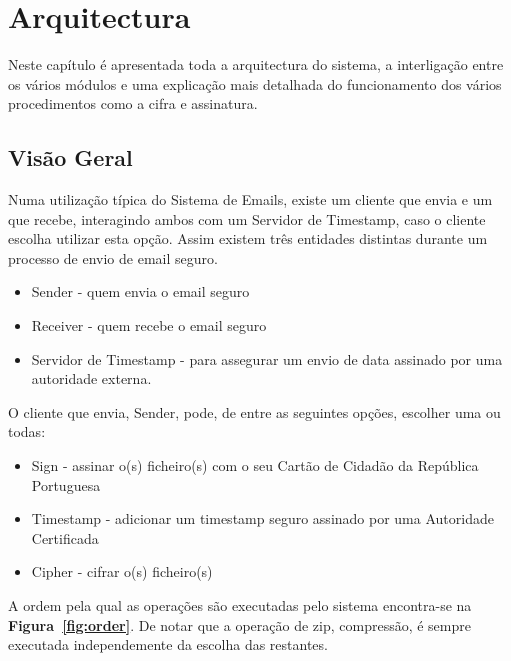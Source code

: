 \chapter{Arquitectura}
\label{chapter:architecture}
Neste capítulo é apresentada toda a arquitectura do sistema, a interligação entre os vários módulos e uma explicação mais detalhada do funcionamento dos vários procedimentos como a cifra e assinatura.
\section{Visão Geral}
\label{section:estrutura}

Numa utilização típica do Sistema de Emails, existe um cliente que envia e um que recebe, interagindo ambos com um Servidor de Timestamp, caso o cliente escolha utilizar esta opção.
Assim existem três entidades distintas durante um processo de envio de email seguro.
\begin{itemize}
\item Sender - quem envia o email seguro
\item Receiver - quem recebe o email seguro
\item Servidor de Timestamp - para assegurar um envio de data assinado por uma autoridade externa.
\end{itemize}

O cliente que envia, Sender, pode, de entre as seguintes opções, escolher uma ou todas:
\begin{itemize}
\item Sign - assinar o(s) ficheiro(s) com o seu Cartão de Cidadão da República Portuguesa
\item Timestamp - adicionar um timestamp seguro assinado por uma Autoridade Certificada
\item Cipher - cifrar o(s) ficheiro(s)
\end{itemize}

A ordem pela qual as operações são executadas pelo sistema encontra-se na \textbf{Figura~\ref{fig:order}}. De notar que a operação de zip, compressão, é sempre executada independemente da escolha das restantes.

